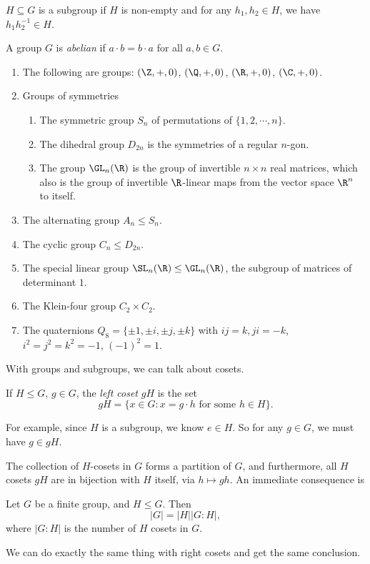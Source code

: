 \documentclass[a4paper]{article}
\begin{document}
\begin{lemma}
  $H \subseteq G$ is a subgroup if $H$ is non-empty and for any $h_1, h_2 \in H$, we have $h_1h_2^{-1} \in H$.
\end{lemma}

\begin{defi}
  A group $G$ is \emph{abelian} if $a\cdot b = b\cdot a$ for all $a, b\in G$.
\end{defi}

\begin{eg}\leavevmode
  \begin{enumerate}
    \item The following are groups: $(\Z, +, 0)$, $(\Q, +, 0)$, $(\R, +, 0)$, $(\C, +, 0)$.
    \item Groups of symmetries
      \begin{enumerate}
        \item The symmetric group $S_n$ of permutations of $\{1, 2, \cdots, n\}$.
        \item The dihedral group $D_{2n}$ is the symmetries of a regular $n$-gon.
        \item The group $\GL_n(\R)$ is the group of invertible $n\times n$ real matrices, which also is the group of invertible $\R$-linear maps from the vector space $\R^n$ to itself.
      \end{enumerate}
    \item The alternating group $A_n \leq S_n$.
    \item The cyclic group $C_n \leq D_{2n}$.
    \item The special linear group $\SL_n(\R) \leq \GL_n(\R)$, the subgroup of matrices of determinant $1$.
    \item The Klein-four group $C_2 \times C_2$.
    \item The quaternions $Q_8 = \{\pm 1, \pm i, \pm j, \pm k\}$ with $ij = k, ji = -k$, $i^2 = j^2 = k^2 = -1$, $(-1)^2 = 1$.
  \end{enumerate}
\end{eg}

With groups and subgroups, we can talk about cosets.
\begin{defi}[Coset]
  If $H \leq G$, $g \in G$, the \emph{left coset} $gH$ is the set
  \[
    gH = \{x \in G: x = g\cdot h\text{ for some }h \in H\}.
  \]
\end{defi}
For example, since $H$ is a subgroup, we know $e \in H$. So for any $g \in G$, we must have $g \in gH$.

The collection of $H$-cosets in $G$ forms a partition of $G$, and furthermore, all $H$ cosets $gH$ are in bijection with $H$ itself, via $h \mapsto gh$. An immediate consequence is
\begin{thm}
  Let $G$ be a finite group, and $H \leq G$. Then
  \[
    |G| = |H| |G:H|,
  \]
  where $|G:H|$ is the number of $H$ cosets in $G$.
\end{thm}
We can do exactly the same thing with right cosets and get the same conclusion.
\end{document}
